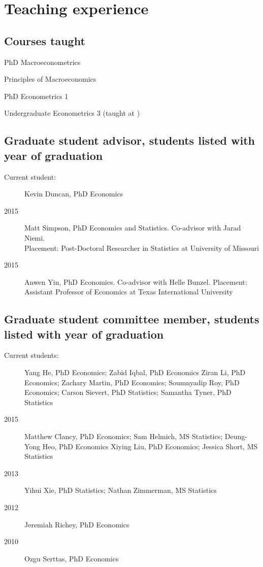 \documentclass[12pt]{article}%
\newcommand{\allcaps}[1]{\textls{\MakeUppercase{#1}}}
\newcommand{\p}{\rlap{.}}
\begin{document}
\section*{Teaching experience}

\subsection*{Courses taught}
\begin{description}[noitemsep]
\item[2011--present] PhD Macroeconometrics
\item[2010--present] Principles of Macroeconomics
\item[2009--present] PhD Econometrics 1
\item[2009\p] Undergraduate Econometrics 3 (taught at \allcaps{UCSD})
\end{description}

\subsection*{Graduate student advisor, students listed with year of graduation}
\begin{description}
\item[Current student:] Kevin Duncan, PhD Economics
\item[2015] Matt Simpson, PhD Economics and Statistics.  Co-advisor
with Jarad Niemi.\\
Placement: Post-Doctoral Researcher in Statistics at University of Missouri
\item[2015] Anwen Yin, PhD Economics. Co-advisor with Helle Bunzel.
Placement: Assistant Professor of Economics at Texas 
International University
\end{description}

\subsection*{Graduate student committee member, students listed with year of graduation}

\begin{description}
\item[Current students:]
Yang He, PhD Economics;
Zabid Iqbal, PhD Economics
Ziran Li, PhD Economics;
Zachary Martin, PhD Economics;
Soumnyadip Roy, PhD Economics;
Carson Sievert, PhD Statistics;
Samantha Tyner, PhD Statistics
\item[2015]
Matthew Clancy, PhD Economics;
Sam Helmich, MS Statistics;
Deung-Yong Heo, PhD Economics
Xiying Liu, PhD Economics;
Jessica Short, MS Statistics
\item[2013]
Yihui Xie, PhD Statistics;
Nathan Zimmerman, MS Statistics
\item[2012] Jeremiah Richey, PhD Economics
\item[2010] Ozgu Serttas, PhD Economics
\end{description}
\end{document}

